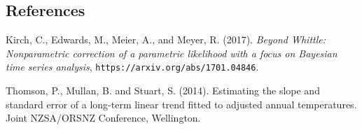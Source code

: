 \documentclass[12pt]{article}
\begin{document}
%        
%
%        

\subsection*{References}

\begin{description}


\item Kirch, C., Edwards, M., Meier, A., and Meyer, R. (2017). \textit{Beyond Whittle: Nonparametric correction of a parametric likelihood with a focus on Bayesian time series analysis},
{\tt  https://arxiv.org/abs/1701.04846}.

\item Thomson, P., Mullan, B. and Stuart, S. (2014). Estimating the slope and standard error of a long-term linear trend fitted to adjusted annual temperatures. Joint  NZSA/ORSNZ Conference, Wellington.


\end{description}
\end{document}
